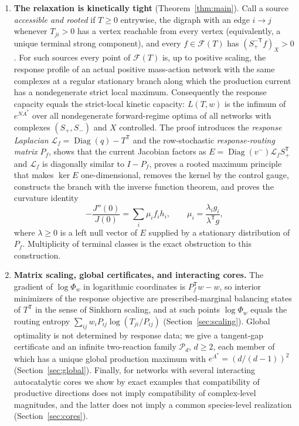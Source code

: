 \documentclass[11pt,reqno]{amsart}
\theoremstyle{plain}
\theoremstyle{definition}
\theoremstyle{remark}
\numberwithin{equation}{section}
\newcommand{\Diag}{\operatorname{Diag}}
\newcommand{\Ker}{\operatorname{ker}}
\newcommand{\Sp}{S_{+}}
\newcommand{\Sm}{S_{-}}
\newcommand{\T}{\mathsf{T}}
\newcommand{\cone}{\mathcal{F}}
\begin{document}
\begin{enumerate}[label=(\Alph*),leftmargin=2.2em]
\item\label{res:D} \textbf{The relaxation is kinetically tight} (Theorem~\ref{thm:main}).  Call a source \emph{accessible and rooted} if $T\ge0$ entrywise, the digraph with an edge $i\to j$ whenever $T_{ji}>0$ has a vertex reachable from every vertex (equivalently, a unique terminal strong component), and every $f\in\cone(T)$ has $(\Sp^{-\T}f)_X>0$.  For such sources every point of $\cone(T)$ is, up to positive scaling, the response profile of an actual positive mass-action network with the same complexes at a regular stationary branch along which the production current has a nondegenerate strict local maximum.  Consequently the response capacity equals the strict-local kinetic capacity: $L(T,w)$ is the infimum of $e^{NA^*}$ over all nondegenerate forward-regime optima of all networks with complexes $(\Sp,\Sm)$ and $X$ controlled.  The proof introduces the \emph{response Laplacian} $\mathcal L_f=\Diag(q)-T^{\T}$ and the row-stochastic \emph{response-routing matrix} $P_f$, shows that the current Jacobian factors as $E=\Diag(v^-)\mathcal L_f\Sp^{\T}$ and $\mathcal L_f$ is diagonally similar to $I-P_f$, proves a rooted maximum principle that makes $\Ker E$ one-dimensional, removes the kernel by the control gauge, constructs the branch with the inverse function theorem, and proves the curvature identity
\[
-\frac{J''(0)}{J(0)}=\sum_i\mu_i f_ih_i,\qquad \mu_i=\frac{\lambda_ig_i}{\lambda^{\T}g},
\]
where $\lambda\ge0$ is a left null vector of $E$ supplied by a stationary distribution of $P_f$.  Multiplicity of terminal classes is the exact obstruction to this construction.

\item\label{res:E} \textbf{Matrix scaling, global certificates, and interacting cores.}  The gradient of $\log\Phi_w$ in logarithmic coordinates is $P_f^{\T}w-w$, so interior minimizers of the response objective are prescribed-marginal balancing states of $T^{\T}$ in the sense of Sinkhorn scaling, and at such points $\log\Phi_w$ equals the routing entropy $\sum_{ij}w_iP_{ij}\log(T_{ji}/P_{ij})$ (Section~\ref{sec:scaling}).  Global optimality is not determined by response data; we give a tangent-gap certificate and an infinite two-reaction family $\mathcal P_d$, $d\ge2$, each member of which has a unique global production maximum with $e^{A^*}=(d/(d-1))^2$ (Section~\ref{sec:global}).  Finally, for networks with several interacting autocatalytic cores we show by exact examples that compatibility of productive directions does not imply compatibility of complex-level magnitudes, and the latter does not imply a common species-level realization (Section~\ref{sec:cores}).
\end{enumerate}
\end{document}
